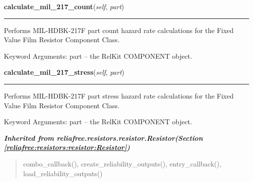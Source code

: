     \vspace{0.5ex}

\hspace{.8\funcindent}\begin{boxedminipage}{\funcwidth}

    \raggedright \textbf{calculate\_mil\_217\_count}(\textit{self}, \textit{part})

    \vspace{-1.5ex}

    \rule{\textwidth}{0.5\fboxrule}
\setlength{\parskip}{2ex}
    Performs MIL-HDBK-217F part count hazard rate calculations for the 
    Fixed Value Film Resistor Component Class.

    Keyword Arguments: part -- the RelKit COMPONENT object.

\setlength{\parskip}{1ex}
    \end{boxedminipage}

    \label{reliafree:resistors:fixed:Film:calculate_mil_217_stress}

    \vspace{0.5ex}

\hspace{.8\funcindent}\begin{boxedminipage}{\funcwidth}

    \raggedright \textbf{calculate\_mil\_217\_stress}(\textit{self}, \textit{part})

    \vspace{-1.5ex}

    \rule{\textwidth}{0.5\fboxrule}
\setlength{\parskip}{2ex}
    Performs MIL-HDBK-217F part stress hazard rate calculations for the 
    Fixed Value Film Resistor Component Class.

    Keyword Arguments: part -- the RelKit COMPONENT object.

\setlength{\parskip}{1ex}
    \end{boxedminipage}


\large{\textbf{\textit{Inherited from reliafree.resistors.resistor.Resistor\textit{(Section \ref{reliafree:resistors:resistor:Resistor})}}}}

\begin{quote}
combo\_callback(), create\_reliability\_outputs(), entry\_callback(), load\_reliability\_outputs()
\end{quote}
